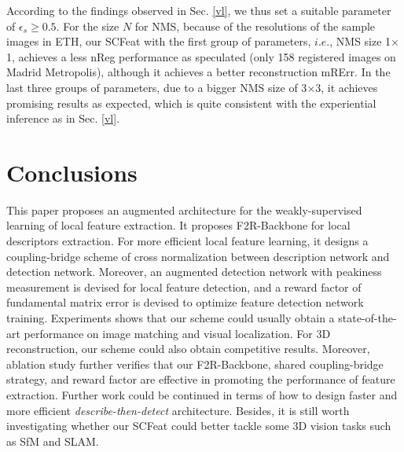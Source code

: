 \documentclass[journal]{IEEEtran}
\begin{document}
According to the findings observed in Sec. \ref{vl}, we thus set a suitable parameter of $\epsilon_s \geq 0.5$. For the size $N$ for NMS, because of the resolutions of the sample images in ETH, our SCFeat with the first group of parameters, $i.e.$, NMS size 1$\times$1, achieves a less nReg performance as speculated (only 158 registered images on Madrid Metropolis), although it achieves a better reconstruction mRErr. In the last three groups of parameters, due to a bigger NMS size of 3$\times$3, it achieves promising results as expected, which is quite consistent with the experiential inference as in Sec. \ref{vl}.


\section{Conclusions}
This paper proposes an augmented architecture for the weakly-supervised learning of local feature extraction. It proposes F2R-Backbone for local descriptors extraction. For more efficient local feature learning, it designs a coupling-bridge scheme of cross normalization between description network and detection network.
Moreover, an augmented detection network with peakiness measurement is devised for local feature detection, and a reward factor of fundamental matrix error is devised to optimize feature detection network training. Experiments shows that our scheme could usually obtain a state-of-the-art performance on image matching and visual localization. For 3D reconstruction, our scheme could also obtain competitive results. Moreover, ablation study further verifies that our F2R-Backbone, shared coupling-bridge strategy, and reward factor are effective in promoting the performance of feature extraction. Further work could be continued in terms of how to design faster and more efficient \emph{describe-then-detect} architecture. Besides, it is still worth investigating whether our SCFeat could better tackle some 3D vision tasks such as SfM and SLAM.
\end{document}
